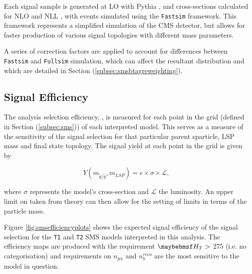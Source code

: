 Each signal sample is generated at \acf{LO} with Pythia \cite{Sjostrand:2006za}, and cross-sections calculated for \acf{NLO} and \acf{NLL} \cite{Beenakker:1996ch}, with events simulated using the \texttt{Fastsim} framework. This framework represents a simplified simulation of the \ac{CMS} detector, but allows for faster production of various signal topologies with different mass parameters. 

A series of correction factors are applied to account for differences between \texttt{Fastsim} \cite{1742-6596-331-3-032049} and \texttt{Fullsim} \cite{1742-6596-331-3-032015} simulation, which can affect the resultant \nbreco distribution and which are detailed in Section (\ref{subsec:smsbtagreweighting}). 

\subsection{Signal Efficiency}

The analysis selection efficiency, \epsilon, is measured for each point in the grid (defined in Section (\ref{subsec:sms})) of each interpreted model. This serves as a measure of the sensitivity of the signal selection for that particular parent sparticle, \ac{LSP} mass and final state topology. The signal yield at each point in the grid is given by 

\begin{equation}
Y(m_{\widetilde{q}/\widetilde{g}},m_{LSP}) = \epsilon \times \sigma \times \mathcal{L},
\end{equation}

where $\sigma$ represents the model's cross-section and $\mathcal{L}$ the luminosity. An upper limit on \sigma taken from theory can then allow for the setting of limits in terms of the particle mass. 

Figure \ref{fig:smsefficiencyplots} shows the expected signal efficiency of the signal selection for the \texttt{T1} and \texttt{T2} \ac{SMS} models interpreted in this analysis. The efficiency maps are produced with the requirement $\theht >$ 275 \GeV (i.e. no \theht categorisation) and requirements on $n_{\text{jet}}$ and $n_{b}^{reco}$ are the most sensitive to the model in question.

